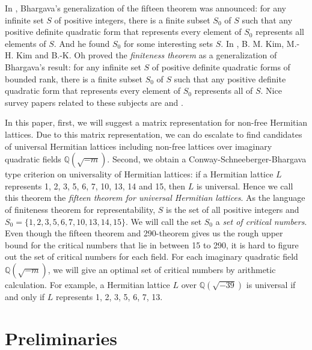 \documentclass[a4paper,10pt,reqno]{amsart}
\begin{document}
In \cite{jhC_00}, Bhargava's generalization of the fifteen theorem was announced: for any infinite
set $S$ of positive integers, there is a finite subset $S_0$ of $S$ such that any positive definite
quadratic form that represents every element of $S_0$ represents all elements of $S$. And he found
$S_0$ for some interesting sets $S$. In \cite{bmK_mhK_bkO_05}, B. M. Kim, M.-H. Kim and B.-K. Oh
proved the \emph{finiteness theorem} as a generalization of Bhargava's result: for any infinite set
$S$ of positive definite quadratic forms of bounded rank, there is a finite subset $S_0$ of $S$
such that any positive definite quadratic form that represents every element of $S_0$ represents
all of $S$. Nice survey papers related to these subjects are \cite{mhK} and \cite{jH_04}.

In this paper, first, we will suggest a matrix representation for
non-free Hermitian lattices. Due to this matrix representation, we
can do escalate to find candidates of universal Hermitian lattices
including non-free lattices over imaginary quadratic fields
${\mathbb{Q}(\sqrt{{-m}})}$. Second, we obtain a Conway-Schneeberger-Bhargava type
criterion on universality of Hermitian lattices: if a Hermitian
lattice $L$ represents 1, 2, 3, 5, 6, 7, 10, 13, 14 and 15, then $L$
is universal. Hence we call this theorem the \emph{fifteen theorem
for universal Hermitian lattices}. As the language of finiteness
theorem for representability, $S$ is the set of all positive
integers and $S_0 = \{1, 2, 3, 5, 6, 7, 10, 13, 14, 15 \}$. We will
call the set $S_0$ a \emph{set of critical numbers}. Even though the
fifteen theorem and 290-theorem gives us the rough upper bound for
the critical numbers that lie in between 15 to 290, it is hard to
figure out the set of critical numbers for each field. For each
imaginary quadratic field ${\mathbb{Q}(\sqrt{{-m}})}$,  we will give an optimal set of
critical numbers by arithmetic calculation. For example, a Hermitian
lattice $L$ over ${\mathbb{Q}(\sqrt{{-39}})}$ is universal if and only if $L$
represents 1, 2, 3, 5, 6, 7, 13.

\section{Preliminaries}
\end{document}
